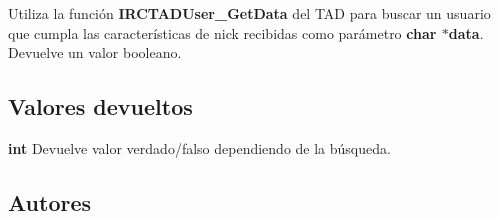 Utiliza la función {\bfseries I\+R\+C\+T\+A\+D\+User\+\_\+\+Get\+Data} del T\+A\+D para buscar un usuario que cumpla las características de nick recibidas como parámetro {\bfseries char $\ast$data}. Devuelve un valor booleano.\hypertarget{server_users_find_by_nick_return_server_users_find_by_nick}{}\subsection{Valores devueltos}\label{server_users_find_by_nick_return_server_users_find_by_nick}

\begin{DoxyItemize}
\item {\bfseries int} Devuelve valor verdado/falso dependiendo de la búsqueda. 
\end{DoxyItemize}\hypertarget{server_users_find_by_nick_authors_server_users_find_by_nick}{}\subsection{Autores}\label{server_users_find_by_nick_authors_server_users_find_by_nick}

